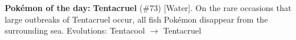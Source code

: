 \textbf{Pokémon of the day:}
\textbf{Tentacruel} (\#73) [Water].
On the rare occasions that large outbreaks of Tentacruel occur, all fish Pok\'emon disappear from the surrounding sea.
Evolutions: Tentacool $\rightarrow$ Tentacruel